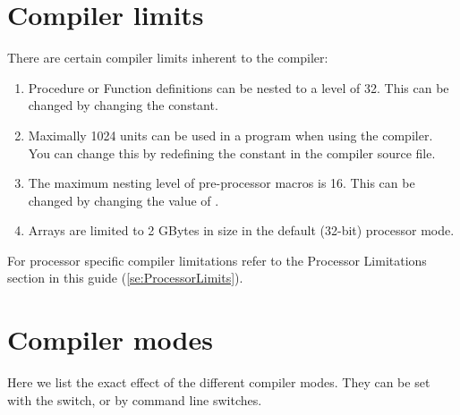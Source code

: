 
\chapter{Compiler limits}
\label{ch:AppC}
There are certain compiler limits inherent to the compiler:
\begin{enumerate}
\item Procedure or Function definitions can be nested to a level of 32. This
can be changed by changing the  constant.
\item Maximally 1024 units can be used in a program when using the compiler.
You can change this by redefining the  constant in the compiler 
source file.
\item The maximum nesting level of pre-processor macros is 16. This can be
changed by changing the value of .
\item Arrays are limited to 2 GBytes in size in the default (32-bit) 
processor mode.
\end{enumerate}

For processor specific compiler limitations refer to the Processor
Limitations section in this guide (\ref{se:ProcessorLimits}).

\chapter{Compiler modes}
\label{ch:AppD}

Here we list the exact effect of the different compiler modes. They can be
set with the  switch, or by command line switches.

